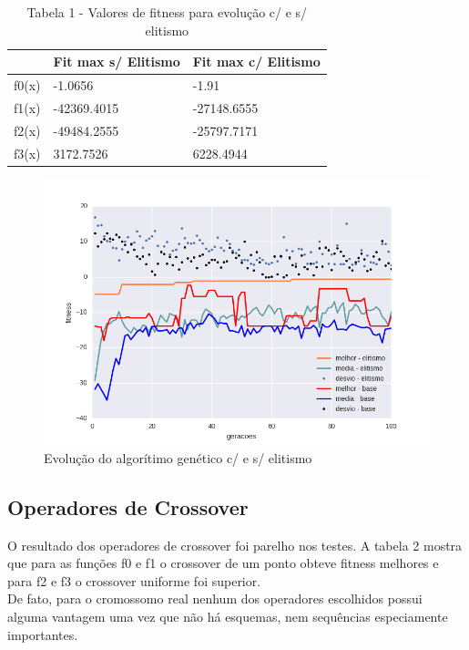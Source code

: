 \documentclass[conference]{IEEEtran}
\begin{document}
\begin{table}[h]
\begin{tabular}{|l|l|l|}
\hline
      & Fit max s/ Elitismo & Fit max c/ Elitismo \\ \hline
f0(x) & -1.0656             & -1.91               \\ \hline
f1(x) & -42369.4015         & -27148.6555         \\ \hline
f2(x) & -49484.2555         & -25797.7171         \\ \hline
f3(x) & 3172.7526           & 6228.4944           \\ \hline
\end{tabular}
\caption*{Tabela 1 - Valores de fitness para evolução c/ e s/ elitismo}
\end{table}


\begin{figure}[!t]
\centering
\includegraphics[scale=0.5]{f0_elitism}
\caption{Evolução do algorítimo genético c/ e s/ elitismo}
\end{figure}

\subsection{Operadores de Crossover}
O resultado dos operadores de crossover foi parelho nos testes. A tabela 2
mostra que para as funções f0 e f1 o crossover de um ponto obteve fitness 
melhores e para f2 e f3 o crossover uniforme foi superior. \\
De fato, para o cromossomo real nenhum dos operadores escolhidos possui alguma 
vantagem uma vez que não há esquemas, nem sequências especiamente importantes.\\
\end{document}
